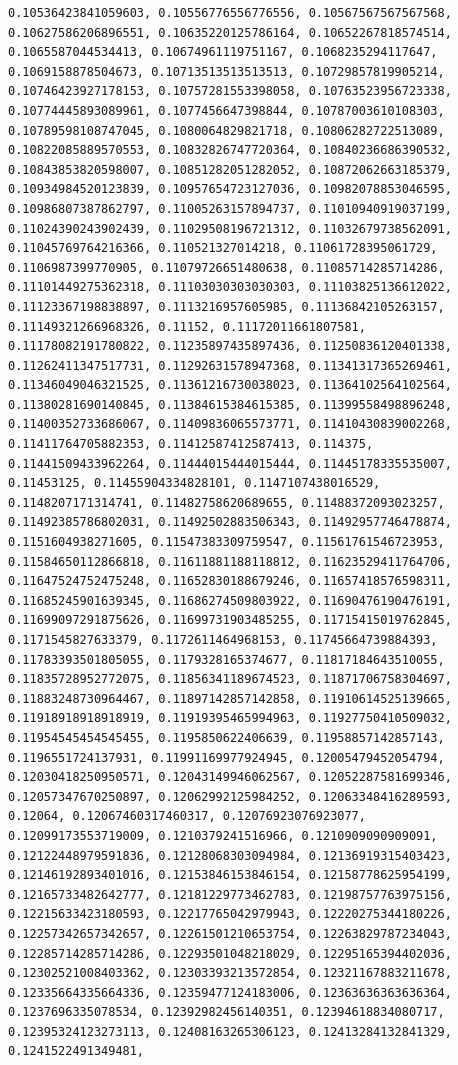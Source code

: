 \documentclass[11pt]{article}
\begin{document}
\begin{Verbatim}[commandchars=\\\{\}]
0.10536423841059603, 0.10556776556776556, 0.10567567567567568, 0.10627586206896551, 0.10635220125786164, 0.10652267818574514, 0.1065587044534413, 0.10674961119751167, 0.1068235294117647, 0.1069158878504673, 0.10713513513513513, 0.10729857819905214, 0.10746423927178153, 0.10757281553398058, 0.10763523956723338, 0.10774445893089961, 0.1077456647398844, 0.10787003610108303, 0.10789598108747045, 0.1080064829821718, 0.10806282722513089, 0.10822085889570553, 0.10832826747720364, 0.10840236686390532, 0.10843853820598007, 0.10851282051282052, 0.10872062663185379, 0.10934984520123839, 0.10957654723127036, 0.10982078853046595, 0.10986807387862797, 0.11005263157894737, 0.11010940919037199, 0.11024390243902439, 0.11029508196721312, 0.11032679738562091, 0.11045769764216366, 0.110521327014218, 0.11061728395061729, 0.1106987399770905, 0.11079726651480638, 0.11085714285714286, 0.11101449275362318, 0.11103030303030303, 0.11103825136612022, 0.11123367198838897, 0.1113216957605985, 0.11136842105263157, 0.11149321266968326, 0.11152, 0.11172011661807581, 0.11178082191780822, 0.11235897435897436, 0.11250836120401338, 0.11262411347517731, 0.11292631578947368, 0.11341317365269461, 0.11346049046321525, 0.11361216730038023, 0.11364102564102564, 0.11380281690140845, 0.11384615384615385, 0.11399558498896248, 0.11400352733686067, 0.11409836065573771, 0.11410430839002268, 0.11411764705882353, 0.11412587412587413, 0.114375, 0.11441509433962264, 0.11444015444015444, 0.11445178335535007, 0.11453125, 0.11455904334828101, 0.1147107438016529, 0.1148207171314741, 0.11482758620689655, 0.11488372093023257, 0.11492385786802031, 0.11492502883506343, 0.11492957746478874, 0.1151604938271605, 0.11547383309759547, 0.11561761546723953, 0.11584650112866818, 0.11611881188118812, 0.11623529411764706, 0.11647524752475248, 0.11652830188679246, 0.11657418576598311, 0.11685245901639345, 0.11686274509803922, 0.11690476190476191, 0.11699097291875626, 0.11699731903485255, 0.11715415019762845, 0.1171545827633379, 0.1172611464968153, 0.11745664739884393, 0.11783393501805055, 0.1179328165374677, 0.11817184643510055, 0.11835728952772075, 0.11856341189674523, 0.11871706758304697, 0.11883248730964467, 0.11897142857142858, 0.11910614525139665, 0.11918918918918919, 0.11919395465994963, 0.11927750410509032, 0.11954545454545455, 0.1195850622406639, 0.11958857142857143, 0.1196551724137931, 0.11991169977924945, 0.12005479452054794, 0.12030418250950571, 0.12043149946062567, 0.12052287581699346, 0.12057347670250897, 0.12062992125984252, 0.12063348416289593, 0.12064, 0.12067460317460317, 0.12076923076923077, 0.12099173553719009, 0.1210379241516966, 0.1210909090909091, 0.12122448979591836, 0.12128068303094984, 0.12136919315403423, 0.12146192893401016, 0.12153846153846154, 0.12158778625954199, 0.12165733482642777, 0.12181229773462783, 0.12198757763975156, 0.12215633423180593, 0.12217765042979943, 0.12220275344180226, 0.12257342657342657, 0.12261501210653754, 0.12263829787234043, 0.12285714285714286, 0.12293501048218029, 0.12295165394402036, 0.12302521008403362, 0.12303393213572854, 0.12321167883211678, 0.12335664335664336, 0.12359477124183006, 0.12363636363636364, 0.1237696335078534, 0.12392982456140351, 0.12394618834080717, 0.12395324123273113, 0.12408163265306123, 0.12413284132841329, 0.1241522491349481, 
\end{Verbatim}
\end{document}
